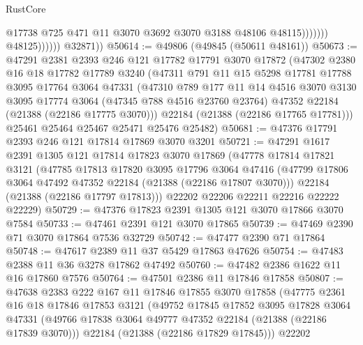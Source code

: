 \begin{lexlean}{RustCore}
\begin{coremodule}
                                  @17738
                                  @725
                                  @471
                                  @11
                                  @3070
                                  @3692
                                  @3070
                                  @3188
                                  @48106
                                  @48115)))))))
                    @48125))))))
        @32871))
@50614 := @49806 (@49845 (@50611 @48161))
@50673 := @47291
    @2381
    @2393
    @246
    @121
    @17782
    @17791
    @3070
    @17872
    (@47302
      @2380
      @16
      @18
      @17782
      @17789
      @3240
      (@47311
        @791
        @11
        @15
        @5298
        @17781
        @17788
        @3095
        @17764
        @3064
        @47331
        (@47310
          @789
          @177
          @11
          @14
          @4516
          @3070
          @3130
          @3095
          @17774
          @3064
          (@47345 @788 @4516 @23760 @23764)
          @47352
          @22184
          (@21388 (@22186 @17775 @3070)))
        @22184
        (@21388 (@22186 @17765 @17781)))
      @25461
      @25464
      @25467
      @25471
      @25476
      @25482)
@50681 := @47376 @17791 @2393 @246 @121 @17814 @17869 @3070 @3201
@50721 := @47291
    @1617
    @2391
    @1305
    @121
    @17814
    @17823
    @3070
    @17869
    (@47778
      @17814
      @17821
      @3121
      (@47785
        @17813
        @17820
        @3095
        @17796
        @3064
        @47416
        (@47799 @17806 @3064 @47492 @47352 @22184 (@21388 (@22186 @17807 @3070)))
        @22184
        (@21388 (@22186 @17797 @17813)))
      @22202
      @22206
      @22211
      @22216
      @22222
      @22229)
@50729 := @47376 @17823 @2391 @1305 @121 @3070 @17866 @3070 @7584
@50733 := @47461 @2391 @121 @3070 @17865
@50739 := @47469 @2390 @71 @3070 @17864 @7536 @32729
@50742 := @47477 @2390 @71 @17864
@50748 := @47617 @2389 @11 @37 @5429 @17863 @47626
@50754 := @47483 @2388 @11 @36 @3278 @17862 @47492
@50760 := @47482 @2386 @1622 @11 @16 @17860 @7576
@50764 := @47501 @2386 @11 @17846 @17858
@50807 := @47638
    @2383
    @222
    @167
    @11
    @17846
    @17855
    @3070
    @17858
    (@47775
      @2361
      @16
      @18
      @17846
      @17853
      @3121
      (@49752
        @17845
        @17852
        @3095
        @17828
        @3064
        @47331
        (@49766 @17838 @3064 @49777 @47352 @22184 (@21388 (@22186 @17839 @3070)))
        @22184
        (@21388 (@22186 @17829 @17845)))
      @22202

\end{coremodule}
\end{lexlean}
